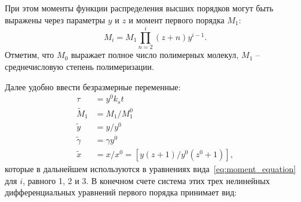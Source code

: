 При этом моменты функции распределения высших порядков могут быть выражены через параметры $y$ и $z$ и момент первого порядка $M_1$:
\begin{equation}
	M_i=M_1 \prod_{n=2}^i(z+n) y^{i-1}.
\end{equation}
Отметим, что $M_0$ выражает полное число полимерных молекул, $M_1$ -- среднечисловую степень полимеризации.

Далее удобно ввести безразмерные переменные:
\begin{equation}
	\begin{aligned}
		\tau & = y^0 k_s t \\
		\tilde{M}_1 & = M_1 / M_1^0 \\
		\tilde{y} & = y / y^0 \\
		\tilde{\gamma} & = \gamma y^0 \\
		\tilde{x} & = x / x^0 = \left[y(z+1) / y^0\left(z^0+1\right)\right],
	\end{aligned}
\end{equation}
которые в дальнейшем используются в уравнениях вида~\ref{eq:moment_equation} для $i$, равного 1, 2 и 3. В конечном счете система этих трех нелинейных дифференциальных уравнений первого порядка принимает вид:

